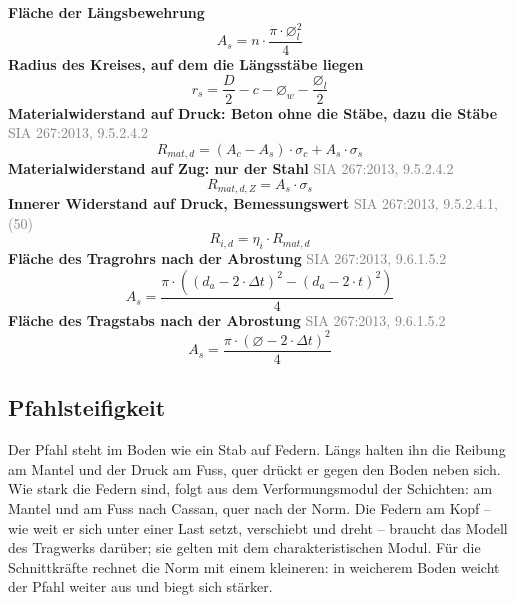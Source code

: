 \documentclass[11pt,a4paper]{article}
\newcommand{\normref}[1]{{\small\textcolor{gray}{#1}}}
\begin{document}
\noindent\textbf{Fläche der Längsbewehrung}
\begin{equation*}
A_s = n \cdot \frac{\pi \cdot \varnothing_l^{2}}{4}
\end{equation*}
\noindent\textbf{Radius des Kreises, auf dem die Längsstäbe liegen}
\begin{equation*}
r_s = \frac{D}{2} - c - \varnothing_w - \frac{\varnothing_l}{2}
\end{equation*}
\noindent\textbf{Materialwiderstand auf Druck: Beton ohne die Stäbe, dazu die Stäbe} \hfill \normref{SIA 267:2013, 9.5.2.4.2}
\begin{equation*}
R_{mat,d} = \left(A_c - A_s\right) \cdot \sigma_c + A_s \cdot \sigma_s
\end{equation*}
\noindent\textbf{Materialwiderstand auf Zug: nur der Stahl} \hfill \normref{SIA 267:2013, 9.5.2.4.2}
\begin{equation*}
R_{mat,d,Z} = A_s \cdot \sigma_s
\end{equation*}
\noindent\textbf{Innerer Widerstand auf Druck, Bemessungswert} \hfill \normref{SIA 267:2013, 9.5.2.4.1, (50)}
\begin{equation*}
R_{i,d} = \eta_i \cdot R_{mat,d}
\end{equation*}
\noindent\textbf{Fläche des Tragrohrs nach der Abrostung} \hfill \normref{SIA 267:2013, 9.6.1.5.2}
\begin{equation*}
A_s = \frac{\pi \cdot \left(\left(d_a - 2 \cdot \Delta t\right)^{2} - \left(d_a - 2 \cdot t\right)^{2}\right)}{4}
\end{equation*}
\noindent\textbf{Fläche des Tragstabs nach der Abrostung} \hfill \normref{SIA 267:2013, 9.6.1.5.2}
\begin{equation*}
A_s = \frac{\pi \cdot \left(\varnothing - 2 \cdot \Delta t\right)^{2}}{4}
\end{equation*}
\subsection{Pfahlsteifigkeit}
Der Pfahl steht im Boden wie ein Stab auf Federn. Längs halten ihn die Reibung am Mantel und der Druck am Fuss, quer drückt er gegen den Boden neben sich. Wie stark die Federn sind, folgt aus dem Verformungsmodul der Schichten: am Mantel und am Fuss nach Cassan, quer nach der Norm. Die Federn am Kopf -- wie weit er sich unter einer Last setzt, verschiebt und dreht -- braucht das Modell des Tragwerks darüber; sie gelten mit dem charakteristischen Modul. Für die Schnittkräfte rechnet die Norm mit einem kleineren: in weicherem Boden weicht der Pfahl weiter aus und biegt sich stärker.
\end{document}
